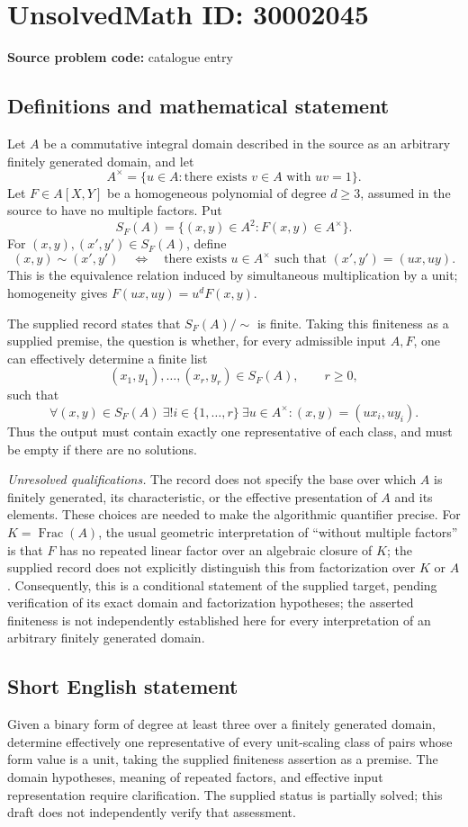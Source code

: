 \documentclass[11pt]{article}
\begin{document}
\section*{UnsolvedMath ID: 30002045}
\textbf{Source problem code:} catalogue entry
\subsection{Definitions and mathematical statement}
Let \(A\) be a commutative integral domain described in the source as an arbitrary finitely generated domain, and let
\[
A^{\times}=\{u\in A:\text{there exists }v\in A\text{ with }uv=1\}.
\]
Let \(F\in A[X,Y]\) be a homogeneous polynomial of degree \(d\geq 3\), assumed in the source to have no multiple factors. Put
\[
S_F(A)=\{(x,y)\in A^2:F(x,y)\in A^{\times}\}.
\]
For \((x,y),(x',y')\in S_F(A)\), define
\[
(x,y)\sim(x',y')
\quad\Longleftrightarrow\quad
\text{there exists }u\in A^{\times}\text{ such that }(x',y')=(ux,uy).
\]
This is the equivalence relation induced by simultaneous multiplication by a unit; homogeneity gives \(F(ux,uy)=u^dF(x,y)\).

The supplied record states that \(S_F(A)/{\sim}\) is finite. Taking this finiteness as a supplied premise, the question is whether, for every admissible input \(A,F\), one can effectively determine a finite list
\[
(x_1,y_1),\ldots,(x_r,y_r)\in S_F(A),\qquad r\geq 0,
\]
such that
\[
\forall(x,y)\in S_F(A)\ \exists! i\in\{1,\ldots,r\}\ \exists u\in A^{\times}:
(x,y)=(ux_i,uy_i).
\]
Thus the output must contain exactly one representative of each class, and must be empty if there are no solutions.

\emph{Unresolved qualifications.} The record does not specify the base over which \(A\) is finitely generated, its characteristic, or the effective presentation of \(A\) and its elements. These choices are needed to make the algorithmic quantifier precise. For \(K=\operatorname{Frac}(A)\), the usual geometric interpretation of ``without multiple factors'' is that \(F\) has no repeated linear factor over an algebraic closure of \(K\); the supplied record does not explicitly distinguish this from factorization over \(K\) or \(A\). Consequently, this is a conditional statement of the supplied target, pending verification of its exact domain and factorization hypotheses; the asserted finiteness is not independently established here for every interpretation of an arbitrary finitely generated domain.
\subsection{Short English statement}
Given a binary form of degree at least three over a finitely generated domain, determine effectively one representative of every unit-scaling class of pairs whose form value is a unit, taking the supplied finiteness assertion as a premise. The domain hypotheses, meaning of repeated factors, and effective input representation require clarification. The supplied status is partially solved; this draft does not independently verify that assessment.
\end{document}
